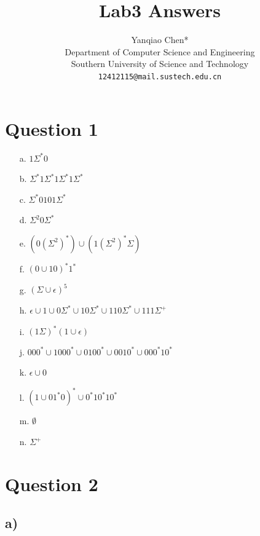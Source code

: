 \documentclass[a4paper, UTF-8]{article}
\theoremstyle{plain}
\begin{document}
\title{\bf{Lab3 Answers}}

\author{Yanqiao Chen*\\ 
  Department of Computer Science and Engineering\\
  Southern University of Science and Technology\\
  \texttt{12412115@mail.sustech.edu.cn}
  }

\maketitle

\section{Question 1}

\begin{itemize}
    \item [a.] $1\Sigma^*0$ 
    \item [b.] $\Sigma^*1\Sigma^*1\Sigma^*1 \Sigma^*$ 
    \item [c.] $\Sigma^*0101\Sigma^*$ 
    \item [d.] $\Sigma^2 0\Sigma^*$ 
    \item [e.] $(0(\Sigma^2)^*)\cup (1(\Sigma^2)^*\Sigma) $ 
    \item [f.] $(0 \cup 10)^* 1^*$
    \item [g.] $(\Sigma \cup \epsilon)^5$ 
    \item [h.] $\epsilon \cup 1 \cup 0\Sigma^* \cup 10\Sigma^* \cup 110\Sigma^* \cup 111\Sigma^+$
    \item [i.] $(1 \Sigma)^*(1 \cup \epsilon)$ 
    \item [j.] $000^* \cup 1000^* \cup 0100^* \cup 0010^* \cup 000^* 1 0^*$
    \item [k.] $\epsilon \cup 0$
    \item [l.] $(1 \cup 01^*0)^*\cup 0^*10^*10^*$
    \item [m.] $\emptyset$
    \item [n.] $\Sigma^+$
\end{itemize}

\section{Question 2} 

\subsection{a)} 
\end{document}
